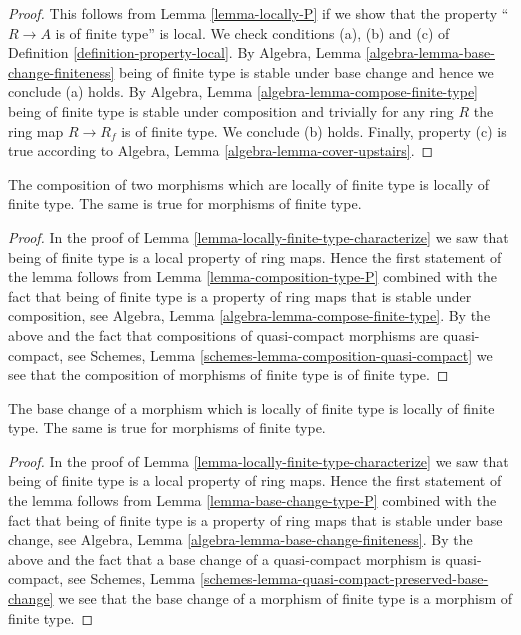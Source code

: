 \begin{proof}
This follows from Lemma \ref{lemma-locally-P} if we show that
the property ``$R \to A$ is of finite type'' is local.
We check conditions (a), (b) and (c) of Definition
\ref{definition-property-local}.
By Algebra, Lemma \ref{algebra-lemma-base-change-finiteness}
being of finite type is stable under base change and hence
we conclude (a) holds. By Algebra, Lemma
\ref{algebra-lemma-compose-finite-type} being of finite type
is stable under composition and trivially for any ring
$R$ the ring map $R \to R_f$ is of finite type.
We conclude (b) holds. Finally, property (c) is true
according to Algebra, Lemma \ref{algebra-lemma-cover-upstairs}.
\end{proof}

\begin{lemma}
\label{lemma-composition-finite-type}
The composition of two morphisms which are locally of finite type is
locally of finite type. The same is true for morphisms of finite type.
\end{lemma}

\begin{proof}
In the proof of Lemma \ref{lemma-locally-finite-type-characterize}
we saw that being of finite type is a local property of ring maps.
Hence the first statement of the lemma follows from
Lemma \ref{lemma-composition-type-P} combined
with the fact that being of finite type is a property of ring maps that is
stable under composition, see
Algebra, Lemma \ref{algebra-lemma-compose-finite-type}.
By the above and the fact that compositions of
quasi-compact morphisms are quasi-compact, see
Schemes, Lemma \ref{schemes-lemma-composition-quasi-compact}
we see that the composition of morphisms of finite type is
of finite type.
\end{proof}

\begin{lemma}
\label{lemma-base-change-finite-type}
The base change of a morphism which is locally of finite type
is locally of finite type. The same is true for morphisms of
finite type.
\end{lemma}

\begin{proof}
In the proof of Lemma \ref{lemma-locally-finite-type-characterize}
we saw that being of finite type is a local property of ring maps.
Hence the first statement of the lemma follows from
Lemma \ref{lemma-base-change-type-P} combined
with the fact that being of finite type is a property of ring maps that is
stable under base change, see
Algebra, Lemma \ref{algebra-lemma-base-change-finiteness}.
By the above and the fact that a base change of a
quasi-compact morphism is quasi-compact, see
Schemes, Lemma \ref{schemes-lemma-quasi-compact-preserved-base-change}
we see that the base change of a morphism of finite type is
a morphism of finite type.
\end{proof}

